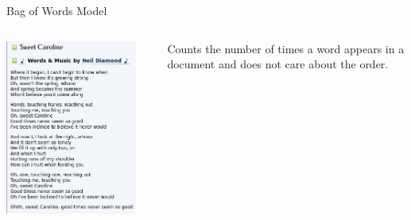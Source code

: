 \documentclass{beamer}
\begin{document}
\begin{frame}{Bag of Words Model}
    \begin{columns}[T]
        \begin{column}{0.5\textwidth}
            \includegraphics[width=0.9\textwidth]{sweet_caroline_lyrics.png}
        \end{column}
        \begin{column}{0.5\textwidth}
    Counts the number of times a word appears in a document and does not care about the order.
        \end{column}
    \end{columns}
\end{frame}
\end{document}
